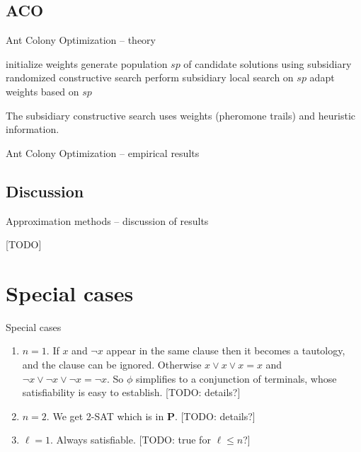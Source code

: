 \documentclass[aspectratio=169, compress, xcolor=table,xcolor=dvipsnames]{beamer}
\newcommand{\cp}{\textbf{P}}
\begin{document}
%
%
%
%

\subsection{ACO}

\begin{frame}
{Ant Colony Optimization -- theory}

	\begin{algorithmic}[1]\sffamily
		\State initialize weights
		\State generate population $sp$ of candidate solutions using subsidiary randomized constructive search
		\State perform subsidiary local search on $sp$
		\State adapt weights based on $sp$
		\EndWhile
		\State{}
	\end{algorithmic}
	The subsidiary constructive search uses weights (pheromone trails) and heuristic information.


\end{frame}

\begin{frame}
	{Ant Colony Optimization -- empirical results}
\end{frame}

\subsection{Discussion}

\begin{frame}
	{Approximation methods -- discussion of results}
	
	[TODO]
\end{frame}

%
%
%
%

\section{Special cases}

\begin{frame}
{Special cases}

\begin{enumerate}
	\item $n=1$. If $x$ and $\lnot x$ appear in the same clause then it becomes a tautology, and the clause can be ignored. Otherwise $x\lor x\lor x = x$ and $\lnot x\lor \lnot x\lor \lnot x = \lnot x$. So $\phi$ simplifies to a conjunction of terminals, whose satisfiability is easy to establish. [TODO: details?]
	\item $n=2$. We get 2-SAT which is in \cp. [TODO: details?]
	\item $\ell=1$. Always satisfiable. [TODO: true for $\ell\leq n$?]
\end{enumerate}

\end{frame}
%
%
%
%
\end{document}
